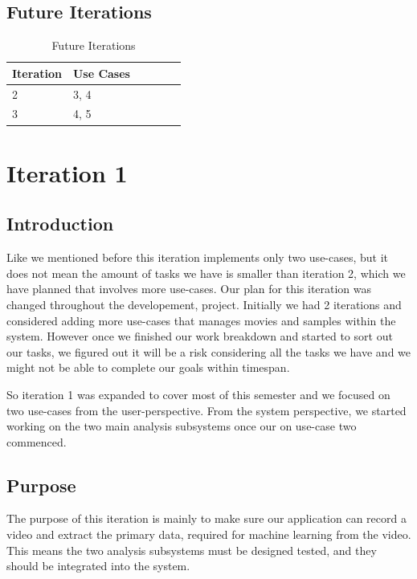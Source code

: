 \documentclass[12pt,a4paper,man]{report}
\begin{document}
\section{Future Iterations}
\label{sec:orgde0cacc}

\begin{table}[htbp]
\caption{\label{table:fuiterplan}
Future Iterations}
\centering
\begin{tabular}{|l|l|l|l|lp{3cm}|}
\hline
\textbf{Iteration} & \textbf{Use Cases} \footnotemark\\
\hline
2 & 3, 4\\
3 & 4, 5\\
\hline
\end{tabular}
\end{table}


\chapter{Iteration 1}
\label{sec:orgb8bcbf8}
\section{Introduction}
\label{sec:org425976e}
Like we mentioned before this iteration implements only two use-cases, but it does not mean the amount of tasks we have is smaller than iteration 2, which we have planned that involves more use-cases. Our plan for this iteration was changed throughout the developement, project. Initially we had 2 iterations and considered adding more use-cases that manages movies and samples within the system. However once we finished our work breakdown and started to sort out our tasks, we figured out it will be a risk considering all the tasks we have and we might not be able to complete our goals within timespan. 

So iteration 1 was expanded to cover most of this semester and we focused on two use-cases from the user-perspective. From the system perspective, we started working on the two main analysis subsystems once our on use-case two commenced. 

\section{Purpose}
\label{sec:orgfad3e28}
The purpose of this iteration is mainly to make sure our application can record a video and extract the primary data, required for machine learning from the video. This means the two analysis subsystems must be designed tested, and they should be integrated into the system.
\end{document}
